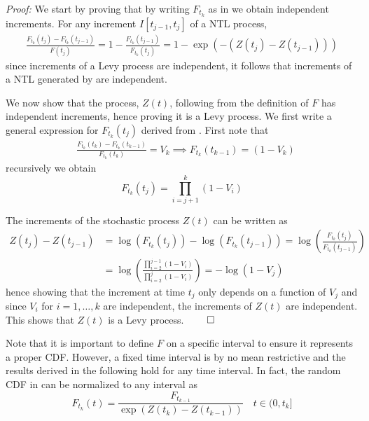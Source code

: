 \textit{Proof:} We start by proving that by writing $F_{t_k}$ as in  we obtain independent increments. For any increment $I[t_{j-1}, t_j]$ of a NTL process,
\begin{equation*}
\begin{split}
\frac{F_{t_k}(t_j) - F_{t_k}(t_{j-1})}{F(t_j)} = 1 - \frac{F_{t_k}(t_{j-1})}{F_{t_k}(t_j)} = 1 - \exp\left(-(Z(t_j) - Z(t_{j-1}))\right)
\end{split}
\end{equation*}
since increments of a Levy process are independent, it follows that increments of a NTL generated by  are independent. 

We now show that the process, $Z(t)$, following from the definition of $F$ has independent increments, hence proving it is a Levy process. We first write a general expression for $F_{t_k}(t_j)$ derived from . First note that
\begin{equation*}
\begin{split}
&\frac{F_{t_k}(t_k) - F_{t_k}(t_{k-1})}{F_{t_k}(t_{k})} = V_k \implies F_{t_k}(t_{k-1}) = (1-V_k)
\end{split}
\end{equation*} 
recursively we obtain
\begin{equation}\label{NTL_F}
F_{t_k}(t_j) = \prod_{i=j+1}^k (1 - V_i)
\end{equation}

The increments of the stochastic process $Z(t)$ can be written as 
\begin{equation*}
\begin{split}
Z(t_j) - Z(t_{j-1}) &= \log(F_{t_k}(t_j)) - \log(F_{t_k}(t_{j-1}))  = \log\left(\frac{F_{t_k}(t_{j})}{F_{t_k}(t_{j-1})}\right) \\ &= \log\left(\frac{\prod_{i=2}^{j-1} (1 - V_i)}{\prod_{i=2}^{j} (1 - V_i)}\right) = -\log(1 - V_j)
\end{split}
\end{equation*}
hence showing that the increment at time $t_j$ only depends on a function of $V_j$ and since $V_i$ for $i=1, \ldots, k$ are independent, the increments of $Z(t)$ are independent. This shows that $Z(t)$ is a Levy process. $\qed$

Note that it is important to define $F$ on a specific interval to ensure it represents a proper CDF. However, a fixed time interval is by no mean restrictive and the results derived in the following hold for any time interval. In fact, the random CDF in  can be normalized to any interval as
\begin{equation*}
F_{t_k}(t) = \frac{F_{t_{k-1}}}{\exp(Z(t_k) - Z(t_{k-1}))} \quad t \in (0, t_k]
\end{equation*}

